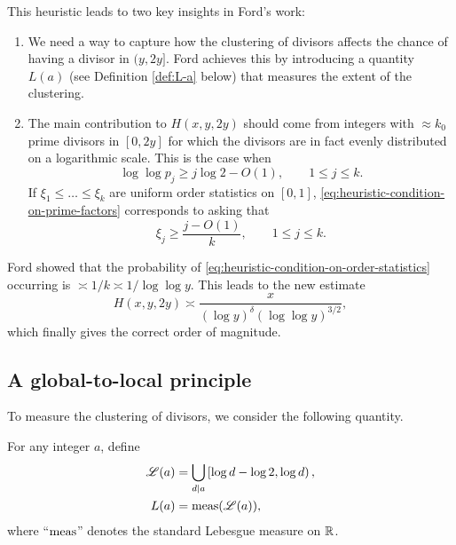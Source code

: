 This heuristic leads to two key insights in Ford's work: 
\begin{enumerate}
    \item We need a way to capture how the clustering of divisors affects the chance of having a divisor in $(y, 2y]$. 
    Ford achieves this by introducing a quantity $L(a)$ (see Definition \ref{def:L-a} below) that measures the extent of the clustering. 

    \item The main contribution to $H(x, y, 2y)$ should come from integers with $\approx k_0$ prime divisors in $[0, 2y]$ for which the divisors are in fact evenly distributed on a logarithmic scale.
    This is the case when 
    \begin{equation} \label{eq:heuristic-condition-on-prime-factors}
        \log \log p_j \ge j \log 2 - O(1), \qquad 1\le j \le k.
    \end{equation}
    If $\xi_1 \le \dots \le \xi_k$ are uniform order statistics on $[0, 1]$, \eqref{eq:heuristic-condition-on-prime-factors} corresponds to asking that 
    \begin{equation} \label{eq:heuristic-condition-on-order-statistics}
        \xi_j \ge \frac{j - O(1)}{k}, \qquad 1\le j \le k.
    \end{equation}
\end{enumerate}
Ford showed that the probability of \eqref{eq:heuristic-condition-on-order-statistics} occurring is $\asymp 1/k \asymp 1/\log \log y$.
This leads to the new estimate
\begin{equation*}
    H(x, y, 2y) \asymp \frac{x}{(\log y)^\delta (\log \log y)^{3/2}},
\end{equation*}
which finally gives the correct order of magnitude.

\subsection{A global-to-local principle}

To measure the clustering of divisors, we consider the following quantity. 
\begin{definition} \label{def:L-a}
    For any integer $a$, define
    \begin{align*}
        \mathscr{L} (a) &= \bigcup \limits_{d\mid a} \left[\log d - \log 2, \log d\right), \\
        L(a) &= \mathrm{meas}(\mathscr{L}(a)),
    \end{align*}
    where ``$\mathrm{meas}$'' denotes the standard Lebesgue measure on $\mathbb{R}$.
\end{definition}

